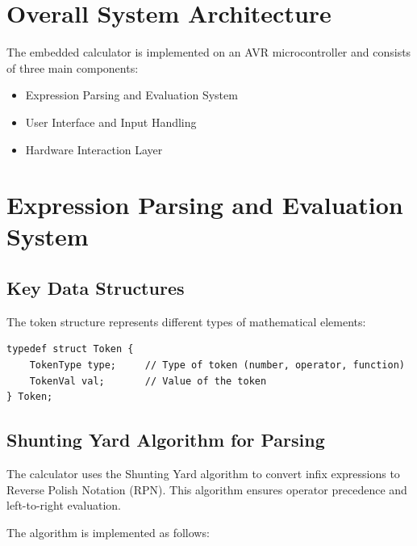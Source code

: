 \documentclass[journal]{IEEEtran}
\numberwithin{equation}{enumi}
\numberwithin{figure}{enumi}
\begin{document}
\section{Overall System Architecture}
The embedded calculator is implemented on an AVR microcontroller and consists of three main components:

\begin{itemize}
    \item Expression Parsing and Evaluation System
    \item User Interface and Input Handling
    \item Hardware Interaction Layer
\end{itemize}
\section{Expression Parsing and Evaluation System}

\subsection{Key Data Structures}

The token structure represents different types of mathematical elements:

\begin{lstlisting}[caption=Token Structure, label=lst:token]
typedef struct Token {
    TokenType type;     // Type of token (number, operator, function)
    TokenVal val;       // Value of the token
} Token;
\end{lstlisting}
\subsection{Shunting Yard Algorithm for Parsing}
The calculator uses the Shunting Yard algorithm to convert infix expressions to Reverse Polish Notation (RPN). This algorithm ensures operator precedence and left-to-right evaluation.

The algorithm is implemented as follows:
\end{document}
